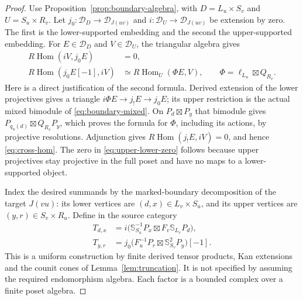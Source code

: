 \documentclass[11pt]{article}
\theoremstyle{definition}
\newcommand{\Hom}{\operatorname{Hom}}
\begin{document}
\begin{proof}
Use Proposition~\ref{prop:boundary-algebra}, with
$D=L_u\times S_v$ and $U=S_u\times R_v$.
Let $j_0:\mathcal D_D\to\mathcal D_{J(uv)}$ and
$i:\mathcal D_U\to\mathcal D_{J(uv)}$ be extension by zero.
The first is the lower-supported embedding and the second the
upper-supported embedding. For $E\in\mathcal D_D$ and
$V\in\mathcal D_U$, the triangular algebra gives
\begin{align}
 R\Hom(iV,j_0E)&=0,\label{eq:upper-lower-zero}\\
 R\Hom(j_0E[-1],iV)&\simeq R\Hom_U(\Phi E,V),\qquad
 \Phi=\ell_{L_u}\boxtimes Q_{R_v}.
       \label{eq:cross-hom}
\end{align}
Here is a direct justification of the second formula. Derived
extension of the lower projectives gives a triangle
$i\Phi E\to j_!E\to j_0E$; its upper restriction is the actual
mixed bimodule of \eqref{eq:boundary-mixed}. On
$P_d\boxtimes P_y$ that bimodule gives
$P_{q_u(d)}\boxtimes Q_{R_v}P_y$, which proves the formula for
$\Phi$, including its actions, by projective resolutions.
Adjunction gives $R\Hom(j_!E,iV)=0$, and hence
\eqref{eq:cross-hom}. The zero in \eqref{eq:upper-lower-zero}
follows because upper projectives stay projective in the full
poset and have no maps to a lower-supported object.

Index the desired summands by the marked-boundary decomposition
of the target $J(vu)$: its lower vertices are
$(d,x)\in L_v\times S_u$, and its upper vertices are
$(y,r)\in S_v\times R_u$. Define in the source category
\begin{align*}
 T_{d,x}&=i\bigl(\mathbb S_{S_u}^{-1}P_x\boxtimes
                        F_v\mathbb S_{L_v}P_d\bigr),\\
 T_{y,r}&=j_0\bigl(F_u^{-1}P_r\boxtimes
                        \mathbb S_{S_v}^{2}P_y\bigr)[-1].
\end{align*}
This is a uniform construction by finite derived tensor products,
Kan extensions and the counit cones of Lemma~\ref{lem:truncation}.
It is not specified by assuming the required endomorphism algebra.
Each factor is a bounded complex over a finite poset algebra.


\end{proof}
\end{document}
